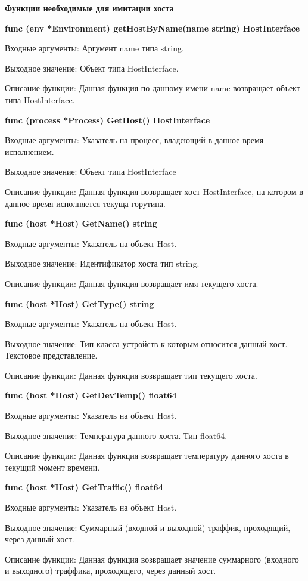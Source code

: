 \textbf{Функции необходимые для имитации хоста}

\textbf{func (env *Environment) getHostByName(name string) HostInterface}

Входные аргументы: Аргумент name типа string.

Выходное значение: Объект типа HostInterface.

Описание функции: Данная функция по данному имени name возвращает объект типа HostInterface.


\textbf{func (process *Process) GetHost() HostInterface }

Входные аргументы: Указатель на процесс, владеющий в данное время исполнением.

Выходное значение: Объект типа HostInterface

Описание функции: Данная функция возвращает хост HostInterface, на котором в данное время исполняется текуща горутина. 

\textbf{func (host *Host) GetName() string }

Входные аргументы: Указатель на объект Host.

Выходное значение: Идентификатор хоста тип string.

Описание функции: Данная функция возвращает имя текущего хоста.


\textbf{func (host *Host) GetType() string }

Входные аргументы: Указатель на объект Host.

Выходное значение: Тип класса устройств к которым относится данный хост. Текстовое представление.

Описание функции: Данная функция возвращает тип текущего хоста.


\textbf{func (host *Host) GetDevTemp() float64 }

Входные аргументы: Указатель на объект Host.

Выходное значение: Температура данного хоста. Тип float64.

Описание функции: Данная функция возвращает температуру данного хоста в текущий момент времени.


\textbf{func (host *Host) GetTraffic() float64}

Входные аргументы: Указатель на объект Host.

Выходное значение: Суммарный (входной и выходной) траффик, проходящий, через данный хост. 

Описание функции: Данная функция возвращает значение суммарного (входного и выходного) траффика, проходящего, через данный хост.


